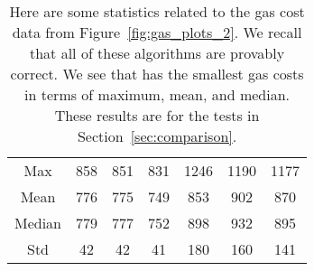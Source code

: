\begin{table}[t]
\centering
\begin{tabular}{|c|
    |S[table-format=3.0]|S[table-format=3.0]
    |S[table-format=3.0]|S[table-format=4.0]
    |S[table-format=4.0]|S[table-format=4.0]|}
\hline
    & \UnrolledOne{} & \UnrolledTwo{} &
     \UnrolledThree{} &
    \WhileOne{} & \WhileTwo{} & \WhileThree{} \\
\hline
Max    & 858 & 851 &  831 & 1246 & 1190 & 1177 \\
Mean   & 776 & 775 &  749 &  853 &  902 &  870 \\
Median & 779 & 777 &  752 &  898 &  932 &  895 \\
Std    &  42 &  42 &   41 &  180 &  160 &  141 \\
\hline
\end{tabular}
\caption[Gas Costs Statistics 2]{Here are some statistics
    related to the gas cost data from Figure~\ref{fig:gas_plots_2}.
    We recall that all of these algorithms are provably correct.
    We see that \UnrolledThree{} has the smallest gas costs
    in terms of maximum, mean, and median.
    These results are for the tests in Section~\ref{sec:comparison}.
    }
\label{table:gas_costs_2}
\end{table}
